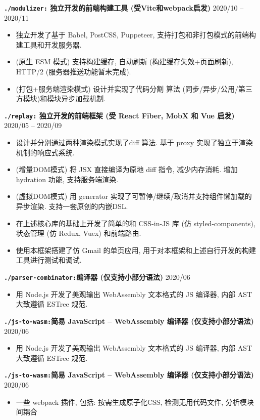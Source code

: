 \documentclass[10 pt]{article}
\begin{document}
\textbf{ \texttt{./modulizer:} 独立开发的前端构建工具 (受Vite和webpack启发) } \hfill 2020/10 -- 2020/11 
\begin{itemize}
\item 独立开发了基于 Babel, PostCSS, Puppeteer, 支持打包和非打包模式的前端构建工具和开发服务器.
\item (原生 ESM 模式) 支持构建缓存, 自动刷新 (构建缓存失效+页面刷新), HTTP/2 (服务器推送功能暂未完成).
\item (打包+服务端渲染模式) 设计并实现了代码分割 算法 (同步/异步/公用/第三方模块)和模块异步加载机制.
\end{itemize}

\textbf{ \texttt{./replay:} 独立开发的前端框架 (受 React Fiber, MobX 和 Vue 启发) } \hfill 2020/05 -- 2020/09
\begin{itemize}
\item 设计并分别通过两种渲染模式实现了diff 算法. 基于 proxy 实现了独立于渲染机制的响应式系统.
\item (增量DOM模式) 将 JSX 直接编译为原地 diff 指令, 减少内存消耗. 增加 hydration 功能, 支持服务端渲染.
\item (虚拟DOM模式) 用 generator 实现了可暂停/继续/取消并支持组件懒加载的异步渲染. 支持一套原创的内嵌DSL.
\item 在上述核心库的基础上开发了简单的和 CSS-in-JS 库 (仿 styled-components), 状态管理 (仿 Redux, Vuex) 和前端路由.
\item 使用本框架搭建了仿 Gmail 的单页应用, 用于对本框架和上述自行开发的构建工具进行测试和调试.
\end{itemize}

\textbf{\texttt{./parser-combinator:}编译器 (仅支持小部分语法)} \hfill 2020/06
\begin{itemize}
\item 用 Node.js 开发了美观输出 WebAssembly 文本格式的 JS 编译器, 内部 AST 大致遵循 ESTree 规范.
\end{itemize}

\textbf{\texttt{./js-to-wasm:}简易 JavaScript -- WebAssembly 编译器 (仅支持小部分语法)} \hfill 2020/06
\begin{itemize}
\item 用 Node.js 开发了美观输出 WebAssembly 文本格式的 JS 编译器, 内部 AST 大致遵循 ESTree 规范.
\end{itemize}

\textbf{\texttt{./js-to-wasm:}简易 JavaScript -- WebAssembly 编译器 (仅支持小部分语法)} \hfill 2020/06
\begin{itemize}
\item 一些 webpack 插件, 包括: 按需生成原子化CSS, 检测无用代码文件, 分析模块间耦合
\end{itemize}
\end{document}
